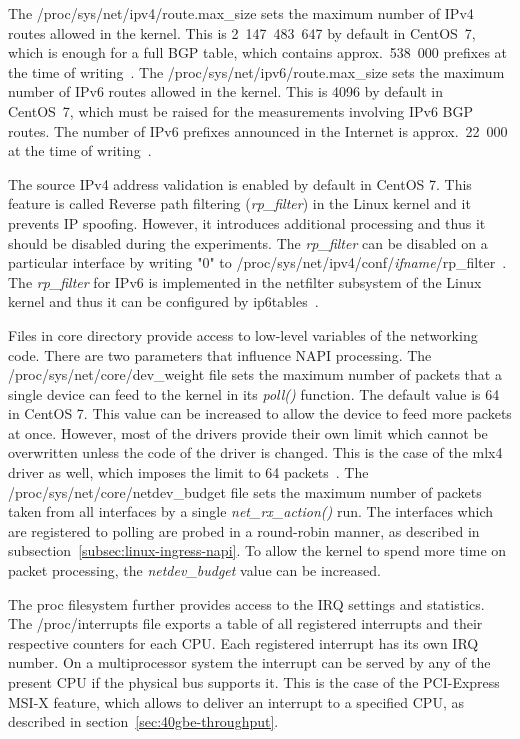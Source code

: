 The /proc/sys/net/ipv4/route.max\_size sets the maximum number of IPv4 routes allowed in the kernel.
This is 2~147~483~647 by default in CentOS~7, which is enough for a full BGP table,
which contains approx.~538~000 prefixes at the time of writing~\cite{bgp-analysis-reports}.
The /proc/sys/net/ipv6/route.max\_size sets the maximum number of IPv6 routes allowed in the kernel.
This is 4096 by default in CentOS~7, which must be raised for the measurements involving IPv6 BGP routes.
The number of IPv6 prefixes announced in the Internet is approx.~22~000 at the time of writing~\cite{bgp-analysis-reports}.

The source IPv4 address validation is enabled by default in CentOS 7.
This feature is called Reverse path filtering ({\it{rp\_filter}}) in the Linux kernel and it prevents IP spoofing.
However, it introduces additional processing and thus it should be disabled during the experiments.
The {\it{rp\_filter}} can be disabled on a particular interface
by writing "0" to /proc/sys/net/ipv4/conf/{\it{ifname}}/rp\_filter~\cite{kernel-doc-ip-sysctl}.
The {\it{rp\_filter}} for IPv6 is implemented in the netfilter subsystem of the Linux kernel and
thus it can be configured by ip6tables~\cite{kernel-source}.

Files in core directory provide access to low-level variables of the networking code.
There are two parameters that influence NAPI processing.
The /proc/sys/net/core/dev\_weight file sets the maximum number of packets that a single device
can feed to the kernel in its {\it{poll()}} function.
The default value is 64 in CentOS 7.
This value can be increased to allow the device to feed more packets at once.
However, most of the drivers provide their own limit which cannot be overwritten unless the code of the driver is changed.
This is the case of the mlx4 driver as well, which imposes the limit to 64 packets~\cite{kernel-source}.
The /proc/sys/net/core/netdev\_budget file sets the
maximum number of packets taken from all interfaces by a single {\it{net\_rx\_action()}} run.
The interfaces which are registered to polling are
probed in a round-robin manner, as described in subsection~\ref{subsec:linux-ingress-napi}.
To allow the kernel to spend more time on packet processing, the {\it{netdev\_budget}} value can be increased.

The proc filesystem further provides access to the IRQ settings and statistics.
The /proc/interrupts file exports a table of all registered interrupts and their respective counters for each CPU.
Each registered interrupt has its own IRQ number.
On a multiprocessor system the interrupt can be served by any of the present CPU if the physical bus supports it.
This is the case of the PCI-Express MSI-X feature, which allows to deliver an interrupt to a specified CPU,
as described in section~\ref{sec:40gbe-throughput}.

